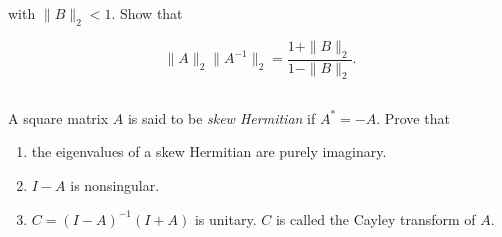 \documentclass[a4paper]{ctexart}
\newcommand{\pf}{\textbf{\color{pink}{proof:}}}
\begin{document}
with $\|B\|_2 < 1$. Show that 

\[
\|A\|_2 \|A^{-1}\|_2 = \frac{1 + \|B\|_2}{1 - \|B\|_2}.
\]

\pf

\subsection{}
A square matrix $A$ is said to be \textit{skew Hermitian} if $A^* = -A$. Prove that 

\begin{enumerate}
    \item the eigenvalues of a skew Hermitian are purely imaginary.
    \item $I - A$ is nonsingular.
    \item $C = (I - A)^{-1}(I + A)$ is unitary. $C$ is called the Cayley transform of $A$.
\end{enumerate}

\pf
\end{document}
